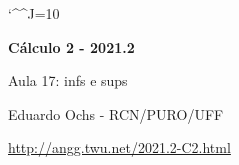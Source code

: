 \documentclass[oneside,12pt]{article}
\begin{document}
\catcode`\^^J=10
\pu
\def\pictgridstyle{\color{GrayPale}\linethickness{0.3pt}}
\def\pictaxesstyle{\linethickness{0.5pt}}





\def\u#1{\par{\footnotesize \url{#1}}}

\def\drafturl{http://angg.twu.net/LATEX/2021-2-C2.pdf}
\def\drafturl{http://angg.twu.net/2021.2-C2.html}
\def\draftfooter{\tiny \href{\drafturl}{\jobname{}} \ColorBrown{\shorttoday{} \hours}}



%

\thispagestyle{empty}

\begin{center}

\vspace*{1.2cm}

{\bf \Large Cálculo 2 - 2021.2}

\bsk

Aula 17: infs e sups

\bsk

Eduardo Ochs - RCN/PURO/UFF

\url{http://angg.twu.net/2021.2-C2.html}

\end{center}

\newpage

%                                                      
\end{document}
